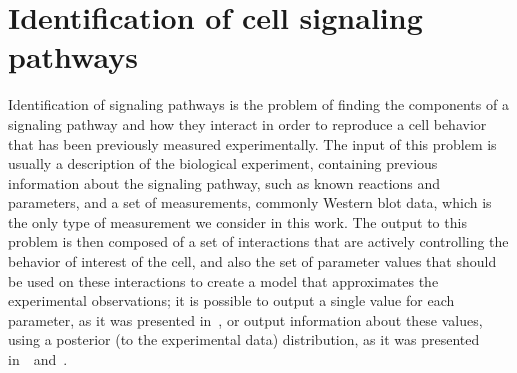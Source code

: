 \section{Identification of cell signaling pathways}
Identification of signaling pathways is the problem of finding the 
components of a signaling pathway and how they interact in order to
reproduce a cell behavior that has been previously measured 
experimentally. The input of this problem is usually a description of 
the biological experiment, containing previous information about the 
signaling pathway, such as known reactions and parameters, and a set of 
measurements, commonly Western blot data, which is the only type of
measurement we consider in this work. The output to this problem is then
composed of a set of interactions that are actively controlling the
behavior of interest of the cell, and also the set of parameter values 
that should be used on these interactions to create a model that
approximates the experimental observations; it is possible to output a
single value for each parameter, as it was presented in~\cite{Wu15}, or
output information about these values, using a posterior (to the
experimental data) distribution, as it was presented
in~\cite{Liepe2014}~and~\cite{Xura20}.

